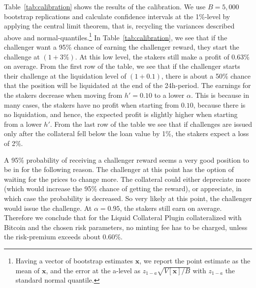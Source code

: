 \documentclass[english,11pt]{article}
\begin{document}
Table~\eqref{tab:calibration} shows the results of the calibration. We use $B=5,000$
bootstrap replications and calculate confidence intervals at the 1\%-level by applying
the central limit theorem, that is, recycling the variances described above and 
normal-quantiles.\footnote{Having a vector of bootstrap estimates 
$\mathbf{x}$, we report the point estimate as the mean of $\mathbf{x}$, and the
error at the a-level as $z_{1-a}\sqrt{V[\mathbf{x}]/B}$ with $z_{1-a}$ the standard normal quantile.}
In Table~\eqref{tab:calibration}, we see that if the challenger want a 95\% chance of earning
the challenger reward, they start the challenge at $(1+3\%)$. At this low level, the 
stakers still make a profit of 0.63\% on average. From the first row of the table, we 
see that if the challenger starts their challenge at the liquidation level of $(1+0.1)$,
there is about a 50\% chance that the position will be liquidated at the end of the
24h-period. The earnings for the stakers decrease when moving from $h'=0.10$ to a
lower $\alpha$. This is because in many cases, the stakers have no profit when
starting from $0.10$, because there is no liquidation, and hence, the expected profit
is slightly higher when starting from a lower $h'$.
From the last row of the table we see that if challenges are issued only after the
collateral fell below the loan value by 1\%, the stakers expect a loss of 2\%.

A 95\% probability of receiving a challenger reward seems a very good position
to be in for the following reason. The challenger at this point has the option of 
waiting for the prices to change more.
The collateral could either depreciate more (which would increase
the 95\% chance of getting the reward), or appreciate, in which case the probability
is decreased. So very likely at this point, the challenger would issue the challenge.
At $\alpha=0.95$, the stakers still earn on average. Therefore we conclude
that for the Liquid Collateral Plugin collateralized with Bitcoin and the chosen risk parameters,
no minting fee has to be charged, unless the risk-premium exceeds about 0.60\%.
\end{document}
